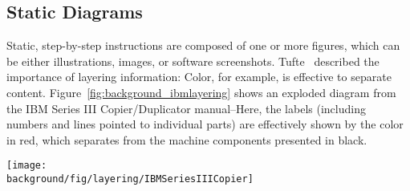 


\subsection{Static Diagrams}

Static, step-by-step instructions are composed of one or more figures, which can be either illustrations, images, or software screenshots.
%
Tufte~\cite{tufte1990envisioning} described the importance of layering information:  Color, for example, is effective to separate content. Figure~\ref{fig:background_ibmlayering} shows an exploded diagram from the IBM Series III Copier/Duplicator manual--Here, the labels (including numbers and lines pointed to individual parts) are effectively shown by the color in red, which separates from the machine components presented in black.


\begin{figure*}[th!]
  \centering
  \texttt{[image: \\background/fig/layering/IBMSeriesIIICopier]}
  \caption{Color can differentiate between annotation (numbered labels are shown in red) and annotated information (over 300 parts are placed in this diagram)~\cite{tufte1990envisioning}.
  }
  \label{fig:background_ibmlayering}
\end{figure*}

